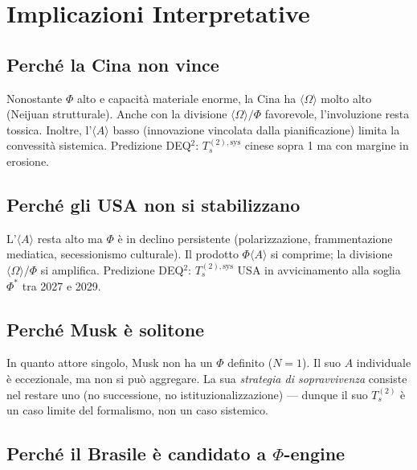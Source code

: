 \section{Implicazioni Interpretative}\label{implicazioni-interpretative}

\subsection{Perché la Cina non vince}\label{perchuxe9-la-cina-non-vince}

Nonostante \(\Phi\) alto e capacità materiale enorme, la Cina ha
\(\langle\Omega\rangle\) molto alto (Neijuan strutturale). Anche con la
divisione \(\langle\Omega\rangle/\Phi\) favorevole, l'involuzione resta
tossica. Inoltre, l'\(\langle A\rangle\) basso (innovazione vincolata
dalla pianificazione) limita la convessità sistemica. Predizione DEQ$^2$:
\(T_s^{(2),\text{sys}}\) cinese sopra 1 ma con margine in erosione.

\subsection{Perché gli USA non si
stabilizzano}\label{perchuxe9-gli-usa-non-si-stabilizzano}

L'\(\langle A\rangle\) resta alto ma \(\Phi\) è in declino persistente
(polarizzazione, frammentazione mediatica, secessionismo culturale). Il
prodotto \(\Phi\langle A\rangle\) si comprime; la divisione
\(\langle\Omega\rangle/\Phi\) si amplifica. Predizione DEQ$^2$:
\(T_s^{(2),\text{sys}}\) USA in avvicinamento alla soglia \(\Phi^*\) tra
2027 e 2029.

\subsection{Perché Musk è solitone}\label{perchuxe9-musk-uxe8-solitone}

In quanto attore singolo, Musk non ha un \(\Phi\) definito (\(N=1\)). Il
suo \(A\) individuale è eccezionale, ma non si può aggregare. La sua
\emph{strategia di sopravvivenza} consiste nel restare uno (no
successione, no istituzionalizzazione) --- dunque il suo \(T_s^{(2)}\) è
un caso limite del formalismo, non un caso sistemico.

\subsection{Perché il Brasile è candidato a
$\Phi$-engine}\label{perchuxe9-il-brasile-uxe8-candidato-a-ux3c6-engine}

